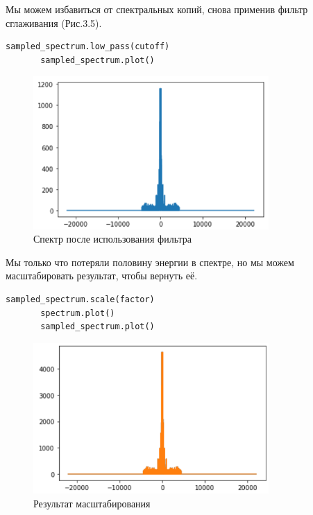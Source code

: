 \documentclass[a4paper,12pt]{report}
\begin{document}
    Мы можем избавиться от спектральных копий, снова применив фильтр сглаживания (Рис.3.5).
\begin{lstlisting}[caption=Применение фильтра сглаживания]
       sampled_spectrum.low_pass(cutoff)
       sampled_spectrum.plot()
\end{lstlisting}
\begin{figure}[H]
        \centering
        \includegraphics[width=0.8\textwidth]{fig3-5.PNG}
        \caption{Спектр после использования фильтра}
        \label{fig:fig3-5}
\end{figure}  

    Мы только что потеряли половину энергии в спектре, но мы можем масштабировать результат, чтобы вернуть её.     
\begin{lstlisting}[caption=Применение масштабирования]
       sampled_spectrum.scale(factor)
       spectrum.plot()
       sampled_spectrum.plot()
\end{lstlisting}
\begin{figure}[H]
        \centering
        \includegraphics[width=0.8\textwidth]{fig3-6.PNG}
        \caption{Результат масштабирования}
        \label{fig:fig3-6}
\end{figure} 
\end{document}
